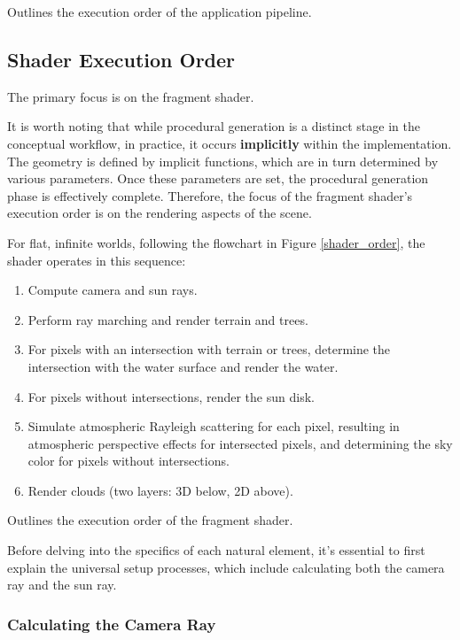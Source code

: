 {Outlines the execution order of the application pipeline.
}

\subsection{Shader Execution Order}

The primary focus is on the fragment shader.

It is worth noting that while procedural generation is a distinct stage in the conceptual workflow, in practice, it occurs \textbf{implicitly} within the implementation. The geometry is defined by implicit functions, which are in turn determined by various parameters. Once these parameters are set, the procedural generation phase is effectively complete. Therefore, the focus of the fragment shader’s execution order is on the rendering aspects of the scene.

For flat, infinite worlds, following the flowchart in Figure \ref{shader_order}, the shader operates in this sequence:
\begin{enumerate}
    \item Compute camera and sun rays.
    \item Perform ray marching and render terrain and trees.
    \item For pixels with an intersection with terrain or trees, determine the intersection with the water surface and render the water.
    \item For pixels without intersections, render the sun disk.
    \item Simulate atmospheric Rayleigh scattering for each pixel, resulting in atmospheric perspective effects for intersected pixels, and determining the sky color for pixels without intersections.
    \item Render clouds (two layers: 3D below, 2D above).
\end{enumerate}

{Outlines the execution order of the fragment shader.}

Before delving into the specifics of each natural element, it’s essential to first explain the universal setup processes, which include calculating both the camera ray and the sun ray.

\subsubsection{Calculating the Camera Ray}

